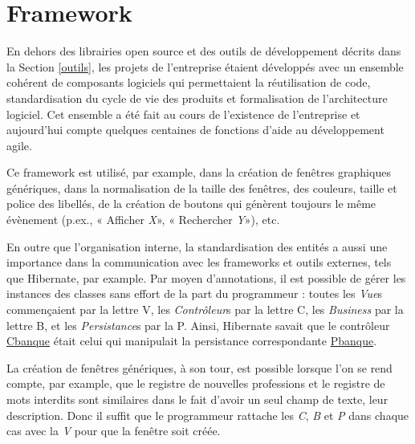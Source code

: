 \pagebreak
\section{Framework}\label{framework}

En dehors des librairies open source et des outils de développement décrits dans la Section \ref{outils}, les projets de l'entreprise étaient développés avec un ensemble cohérent de composants logiciels qui permettaient la réutilisation de code, standardisation du cycle de vie des produits et formalisation de l'architecture logiciel. Cet ensemble a été fait au cours de l'existence de l'entreprise et aujourd'hui compte quelques centaines de fonctions d'aide au développement agile.


Ce framework est utilisé, par example, dans la création de fenêtres graphiques génériques, dans la normalisation de la taille des fenêtres, des couleurs, taille et police des libellés, de la création de boutons qui génèrent toujours le même évènement (p.ex., « Afficher \emph{X}», « Rechercher \emph{Y}»), etc. 

En outre que l'organisation interne, la standardisation des entités a aussi une importance dans la communication avec les frameworks et outils externes, tels que Hibernate, par example. Par moyen d'annotations, il est possible de gérer les instances des classes sans effort de la part du programmeur : toutes les \textit{Vue}s commençaient par la lettre V, les \textit{Contrôleur}s par la lettre C, les \textit{Business} par la lettre B, et les \textit{Persistance}s par la P. Ainsi, Hibernate savait que le contrôleur \underline{Cbanque} était celui qui manipulait la persistance correspondante \underline{Pbanque}.

La création de fenêtres génériques, à son tour, est possible lorsque l'on se rend compte, par example, que le registre de nouvelles professions et le registre de mots interdits sont similaires dans le fait d'avoir un seul champ de texte, leur description. Donc il suffit que le programmeur rattache les \textit{C}, \textit{B} et \textit{P} dans chaque cas avec la \textit{V} pour que la fenêtre soit créée.